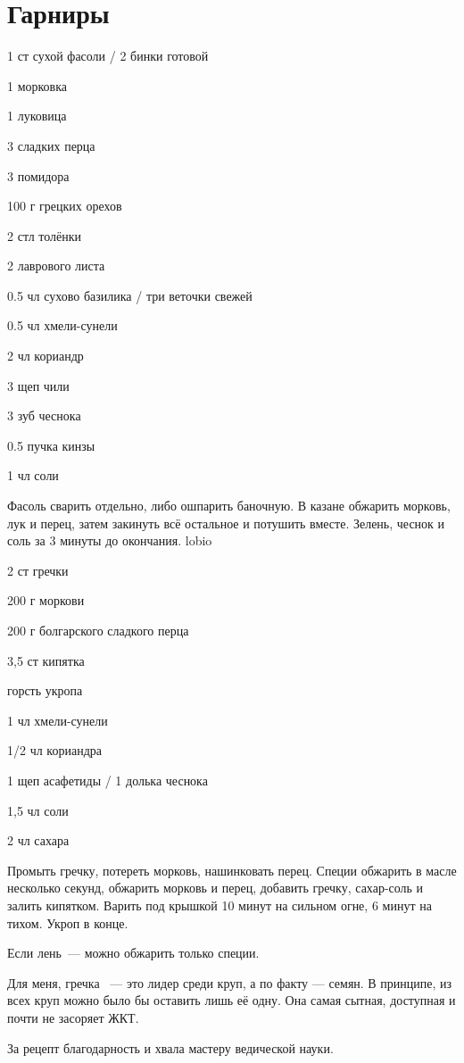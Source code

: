 \chapter*{Гарниры}
\label{sec:garnish}



{
\item 1 ст сухой  фасоли / 2 бинки готовой
\item 1 морковка 
\item 1 луковица
\item 3 сладких перца
\item 3 помидора
\item 100 г грецких орехов 
\item 2 стл толёнки 
}{
\item 2 лаврового листа
\item 0.5 чл сухово базилика / три веточки свежей
\item 0.5 чл хмели-сунели
\item 2 чл кориандр
\item 3 щеп чили 
\item 3 зуб чеснока 
\item 0.5 пучка кинзы
\item 1 чл соли
}{
Фасоль сварить отдельно, либо ошпарить баночную. В казане обжарить морковь, лук и перец, затем закинуть всё остальное и потушить вместе. Зелень, чеснок и соль за 3 минуты до окончания.
}{}{lobio}

{
\item 2 ст гречки
\item 200 г моркови
\item 200 г болгарского сладкого перца
\item 3,5 ст кипятка
\item горсть укропа
}{
\item 1 чл хмели-сунели
\item 1/2 чл кориандра
\item 1 щеп асафетиды / 1 долька чеснока
\item 1,5 чл соли
\item 2 чл сахара
}{
Промыть гречку, потереть морковь, нашинковать перец. Специи обжарить в масле несколько секунд, обжарить морковь и перец, добавить гречку, сахар-соль и залить кипятком. Варить под крышкой 10 минут на сильном огне, 6 минут на тихом. Укроп в конце.
}{
\begin{advice}
\item Если лень~--- можно обжарить только специи.
\item Для меня, гречка ~--- это лидер среди круп, а по факту — семян. В принципе, из всех круп можно было бы оставить лишь её одну. Она самая сытная, доступная и почти не засоряет ЖКТ. 
\item За рецепт благодарность и хвала мастеру ведической науки. 
\end{advice}}{}



